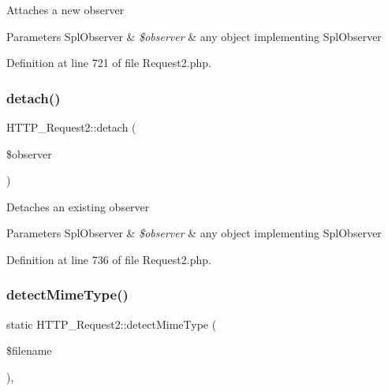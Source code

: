 Attaches a new observer


\begin{DoxyParams}[1]{Parameters}
Spl\+Observer & {\em \$observer} & any object implementing Spl\+Observer \\
\hline
\end{DoxyParams}


Definition at line 721 of file Request2.\+php.

\mbox{\label{classHTTP__Request2_a43da613f3526bfe033f5fafd58f9c50c}} 
\subsubsection{\texorpdfstring{detach()}{detach()}}
{\footnotesize\ttfamily H\+T\+T\+P\+\_\+\+Request2\+::detach (\begin{DoxyParamCaption}\item[{Spl\+Observer}]{\$observer }\end{DoxyParamCaption})}

Detaches an existing observer


\begin{DoxyParams}[1]{Parameters}
Spl\+Observer & {\em \$observer} & any object implementing Spl\+Observer \\
\hline
\end{DoxyParams}


Definition at line 736 of file Request2.\+php.

\mbox{\label{classHTTP__Request2_ac1b8f0776d5faf41503d440350c8b6d6}} 
\subsubsection{\texorpdfstring{detect\+Mime\+Type()}{detectMimeType()}}
{\footnotesize\ttfamily static H\+T\+T\+P\+\_\+\+Request2\+::detect\+Mime\+Type (\begin{DoxyParamCaption}\item[{}]{\$filename }\end{DoxyParamCaption})\hspace{0.3cm}{\ttfamily [static]}, {\ttfamily [protected]}}

